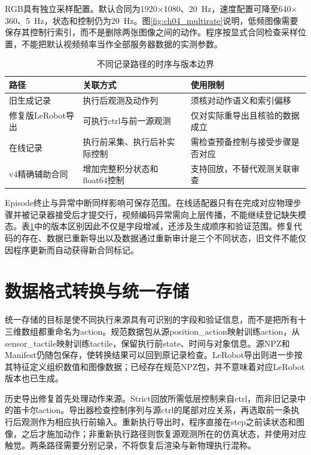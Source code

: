 RGB具有独立采样配置。默认合同为1920$\times$1080、20~Hz，速度配置可降至640$\times$360、5~Hz，状态和控制仍为20~Hz。图\ref{fig:ch04_multirate}说明，低频图像需要保存其控制行索引，而不是删除两张图像之间的动作。程序按显式合同检查采样位置，不能把默认视频频率当作全部服务器数据的实测参数。

\begin{table}[htbp]
 \centering\small
 \caption{不同记录路径的时序与版本边界}
 \label{tab:ch04_recording_versions}
 \begin{tabular}{p{}p{}p{}}
 \hline
 路径 & 关联方式 & 使用限制\\
 \hline
 旧生成记录 & 执行后观测及动作列 & 须核对动作语义和索引偏移\\
 修复版LeRobot导出 & 可执行ctrl与前一源观测 & 仅对实际重导出且核验的数据成立\\
 在线记录 & 执行前采集、执行后补实际控制 & 需检查预备控制与接受步骤是否对应\\
 v4精确辅助合同 & 增加完整积分状态和float64控制 & 支持回放，不替代观测关联审查\\
 \hline
 \end{tabular}
\end{table}

Episode终止与异常中断同样影响可保存范围。在线适配器只有在完成对应物理步骤并被记录器接受后才提交行，视频编码异常需向上层传播，不能继续登记缺失模态。表\ref{tab:ch04_recording_versions}中的版本区别因此不仅是字段增减，还涉及生成顺序和验证范围。修复代码的存在、数据已重新导出以及数据通过重新审计是三个不同状态，旧文件不能仅因程序更新而自动获得新合同标记。

\section{数据格式转换与统一存储}
\label{sec:data_conversion}

统一存储的目标是使不同执行来源具有可识别的字段和验证信息，而不是把所有十三维数组都重命名为action。规范数据包从源position\_action映射训练action，从sensor\_tactile映射训练tactile，保留执行前state、时间与对象信息。源NPZ和Manifest仍随包保存，使转换结果可以回到原记录检查。LeRobot导出则进一步按其特征定义组织数值和图像数据；已经存在规范NPZ包，并不意味着对应LeRobot版本也已生成。

历史导出修复首先处理动作来源。Strict回放所需低层控制来自ctrl，而非旧记录中的笛卡尔action。导出器检查控制序列与源ctrl的尾部对应关系，再选取前一条执行后观测作为相应执行前输入。重新执行导出时，程序直接在step之前读状态和图像，之后才施加动作；非重新执行路径则恢复源观测所在的仿真状态，并使用对应触觉。两条路径需要分别记录，不将恢复后渲染与新物理执行混称。

